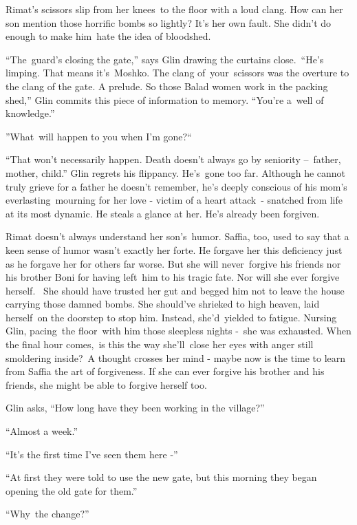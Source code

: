 \documentclass[twoside,11pt]{book}
\begin{document}
Rimat's scissors slip from her knees\ to the floor with a loud clang. How can her son mention those horrific bombs so
lightly? It's her own fault. She didn't do enough to make him\ hate the idea of bloodshed.

{}``The~guard{}'s closing the gate,{}'' says Glin drawing the curtains close.\ {}``He's limping. That means
it's\ Moshko. The clang of~your~scissors was the overture to the clang of the gate. A prelude. So those Balad women
work in the packing shed,{}'' Glin commits this piece of information to memory. ``You're a~well of
knowledge.''

{}''What\ will happen to you when I'm gone?``\ 

{}``That won't necessarily happen. Death doesn't always go by seniority --\ father, mother, child.'' Glin regrets his
flippancy. He{}'s\ gone too far. Although he cannot truly grieve for a father he doesn't remember, he{}'s deeply
conscious of his mom{}'s everlasting\ mourning for her love -  victim of a heart attack\ {}- snatched from life at its
most dynamic. He steals a glance at her. He{}'s already been forgiven.

{Rimat doesn't always understand her son's~humor. Saffia, too, used to
say that a keen sense of humor wasn't exactly her forte. }He forgave her this deficiency just as he forgave her for
others far worse. But she will never\ forgive his friends nor his brother Boni for having left~him to his tragic fate.
Nor will she ever forgive herself.~ She should have trusted her gut and begged him not to leave the house carrying
those damned bombs. She should've shrieked to high heaven, laid herself\ on the doorstep to stop him. Instead,
she'd~yielded to fatigue. Nursing Glin, pacing\ the floor\ with him those sleepless nights -\ she was exhausted. When
the final hour comes,\ is this the way she'll\ close her eyes with anger still smoldering inside?\ A thought crosses
her mind - maybe now is the time to learn from Saffia the art of forgiveness. If she can ever forgive his brother
and{ his friends, she might be able to forgive herself too. }

Glin asks, ``How long have they been working in the village?'' 

{}``Almost a week.'' 

{}``It's the first time I've seen them here -{}'' 

{{}``}At first{ they
were told to use the new gate, but this morning they began opening the old gate for them.'' }

{{}``Why}{\ }{the
change?'' }
\end{document}
